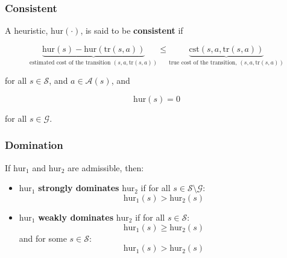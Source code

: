 \subsubsection{Consistent}
\begin{definition}
    A heuristic, $\text{hur}(\cdot)$, is said to be \textbf{consistent} if

    \begin{equation*}
        \underbrace{\text{hur}(s) - \text{hur}(\text{tr}(s,a))}_{\text{estimated cost of the transition }(s,a,\text{tr}(s,a))}
        \leq 
        \underbrace{\text{cst}(s,a,\text{tr}(s,a))}_{\text{true cost of the transition, }(s,a,\text{tr}(s,a))}
    \end{equation*}

    for all $s \in \mathcal{S}$, and $a \in \mathcal{A}(s)$, and

    \begin{equation*}
        \text{hur}(s) = 0
    \end{equation*}

    for all $s \in \mathcal{G}$.
\end{definition}

\subsubsection{Domination}
\begin{definition}
    If $\text{hur}_1$ and $\text{hur}_2$ are admissible, then:
    \begin{itemize}
        \item $\text{hur}_1$ \textbf{strongly dominates} $\text{hur}_2$ if for all $s \in \mathcal{S} \setminus \mathcal{G}$:
        \begin{equation*}
            \text{hur}_1(s) > \text{hur}_2(s)
        \end{equation*}

        \item $\text{hur}_1$ \textbf{weakly dominates} $\text{hur}_2$ if for all $s \in \mathcal{S}$:
        \begin{equation*}
            \text{hur}_1(s) \geq \text{hur}_2(s)
        \end{equation*}
        and for some $s \in \mathcal{S}$:
        \begin{equation*}
            \text{hur}_1(s) > \text{hur}_2(s)
        \end{equation*}
    \end{itemize}
\end{definition}

